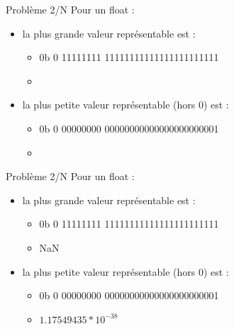 \documentclass{beamer}
\begin{document}
  \begin{frame}{Problème 2/N}
Pour un float :
\begin{itemize}
\item la plus grande valeur représentable est : 
\begin{itemize}
\item 0b \textcolor{SignColor}{0} \textcolor{ExponentColor}{11111111} \textcolor{FractionColor}{11111111111111111111111}
\item 
\end{itemize}
\item la plus petite valeur représentable (hors 0) est : 
\begin{itemize}
\item 0b \textcolor{SignColor}{0} \textcolor{ExponentColor}{00000000} \textcolor{FractionColor}{00000000000000000000001}
\item 
\end{itemize}
\end{itemize}
\bigbreak
\begin{huge}
\textcolor{white}{ }
\end{huge}
  \end{frame}
    
  \begin{frame}{Problème 2/N}
Pour un float :
\begin{itemize}
\item la plus grande valeur représentable est : 
\begin{itemize}
\item 0b \textcolor{SignColor}{0} \textcolor{ExponentColor}{11111111} \textcolor{FractionColor}{11111111111111111111111}
\item NaN
\end{itemize}
\item la plus petite valeur représentable (hors 0) est : 
\begin{itemize}
\item 0b \textcolor{SignColor}{0} \textcolor{ExponentColor}{00000000} \textcolor{FractionColor}{00000000000000000000001}
\item $1.17549435*10^{-38}$
\end{itemize}
\end{itemize}
\bigbreak
\begin{huge}
\textcolor{white}{ }
\end{huge} 
  \end{frame}
    
\end{document}
